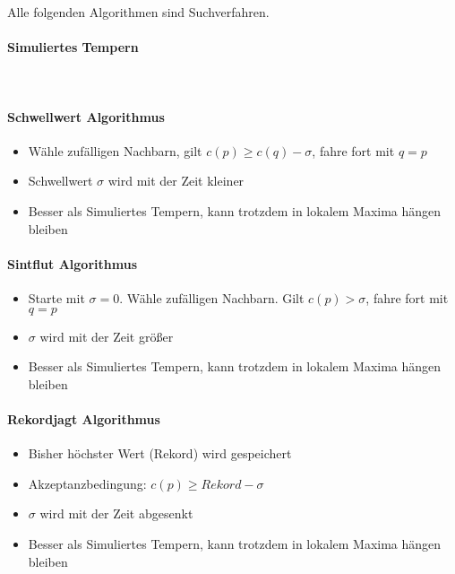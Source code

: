 Alle folgenden Algorithmen sind Suchverfahren.

\paragraph{Simuliertes Tempern}
\text{}\\



\paragraph{Schwellwert Algorithmus}
\begin{itemize}
	\item Wähle zufälligen Nachbarn, gilt \(c(p) \geq c(q) - \sigma\), fahre fort mit \(q = p\)
	\item Schwellwert \(\sigma\) wird mit der Zeit kleiner
	\item Besser als Simuliertes Tempern, kann trotzdem in lokalem Maxima hängen bleiben
\end{itemize}

\paragraph{Sintflut Algorithmus}
\begin{itemize}
	\item Starte mit $\sigma = 0$. Wähle zufälligen Nachbarn. Gilt $c(p) > \sigma$, fahre fort mit $q = p$
	\item $\sigma$ wird mit der Zeit größer
	\item Besser als Simuliertes Tempern, kann trotzdem in lokalem Maxima hängen bleiben
\end{itemize}

\paragraph{Rekordjagt Algorithmus}
\begin{itemize}
	\item Bisher höchster Wert (Rekord) wird gespeichert
	\item Akzeptanzbedingung: \(c(p) \geq Rekord - \sigma\)
	\item \(\sigma\) wird mit der Zeit abgesenkt
	\item Besser als Simuliertes Tempern, kann trotzdem in lokalem Maxima hängen bleiben
\end{itemize}

